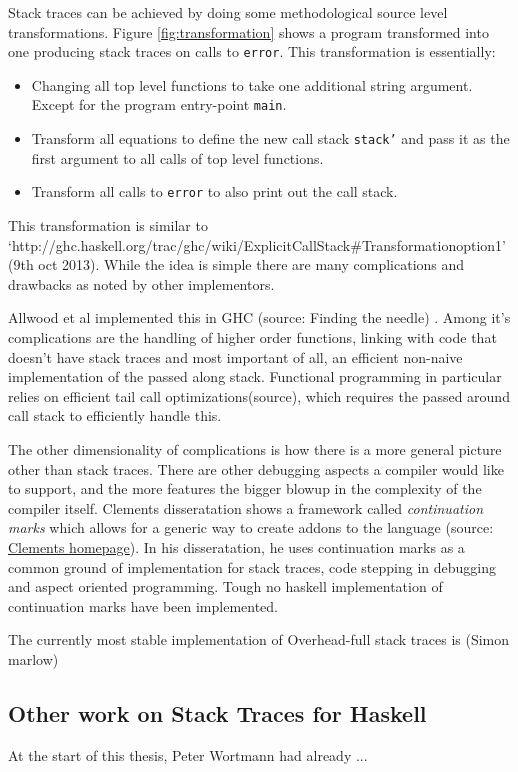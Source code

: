 Stack traces can be achieved by doing some methodological source level
transformations. Figure \ref{fig:transformation} shows a program transformed
into one producing stack traces on calls to \texttt{error}. This transformation is essentially:

\begin{itemize}
\itemsep1pt\parskip0pt
\item
  Changing all top level functions to take one additional string
  argument. Except for the program entry-point \texttt{main}.
\item
  Transform all equations to define the new call stack \texttt{stack'} and
  pass it as the first argument to all calls of top level functions.
\item
  Transform all calls to \texttt{error} to also print out the call stack.
\end{itemize}

This transformation is similar to
`http://ghc.haskell.org/trac/ghc/wiki/ExplicitCallStack\#Transformationoption1'
(9th oct 2013). While the idea is simple there are many complications and
drawbacks as noted by other implementors.

Allwood et al implemented this in GHC (source: Finding the needle) . Among it's complications are the
handling of higher order functions, linking with code that doesn't have stack
traces and most important of all, an efficient non-naive implementation of the
passed along stack. Functional programming in particular relies on efficient
tail call optimizations(source), which requires the passed around call stack to
efficiently handle this.

The other dimensionality of complications is how there is a more general
picture other than stack traces. There are other debugging aspects a compiler
would like to support, and the more features the bigger blowup in the
complexity of the compiler itself.  Clements disseratation shows a framework
called \emph{continuation marks} which allows for a generic way to create
addons to the language (source: \href{http://www.brinckerhoff.org/clements/papers/index.html}{Clements homepage}).
In his disseratation, he uses continuation marks as a
common ground of implementation for stack traces, code stepping in debugging
and aspect oriented programming.  Tough no haskell implementation of
continuation marks have been implemented.

The currently most stable implementation of Overhead-full stack traces is 
(Simon marlow) %

\subsection{Other work on Stack Traces for Haskell}

At the start of this thesis, Peter Wortmann had already ... %
